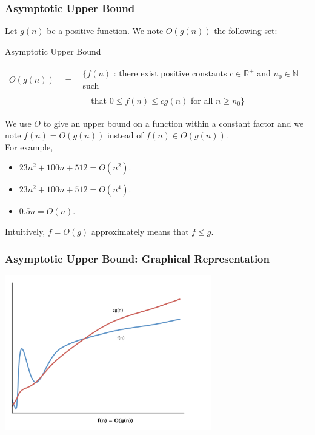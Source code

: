 \documentclass{beamer}
\begin{document}
\begin{frame}%
\frametitle{Asymptotic Upper Bound}

\scriptsize

Let $g(n)$ be a positive function. We note $O(g(n))$ the following set:

\begin{block}{Asymptotic Upper Bound}
\begin{tabular}{lcl}
$O(g(n))$ & $=$ &  $\{ f(n)$ : there exist positive constants $c \in \mathbb{R}^+$ and $n_0 \in \mathbb{N}$ such\\
& & \ \ that $0 \le f(n) \le cg(n)$ for all $n \ge n_0 \}$\\
\end{tabular}
\end{block}

We use $O$ to give an upper bound on a function within a constant factor and we
note $f(n) = O(g(n))$ instead of $f(n) \in O(g(n))$.\\
\vspace{0.3cm}
For example,
\begin{itemize}
\item $23n^2 + 100n + 512 = O(n^2)$.
\item $23n^2 + 100n + 512 = O(n^4)$.
\item $0.5n = O(n)$.
\end{itemize}

\vspace{0.3cm}
Intuitively, $f = O(g)$ approximately means that $f \le g$.

\end{frame}

\begin{frame}[containsverbatim]
\frametitle{Asymptotic Upper Bound: Graphical Representation}

\begin{center}
\includegraphics[width=9cm]{big_O.pdf}
\end{center}

\end{frame}
\end{document}
